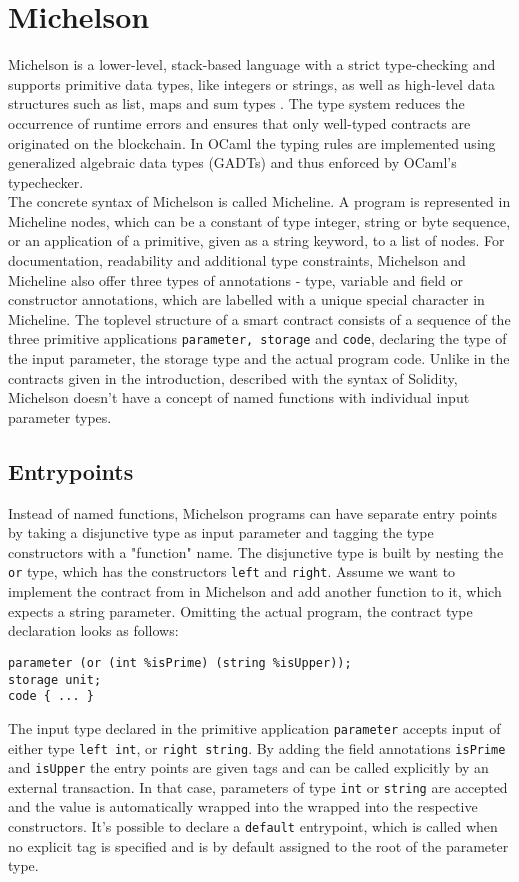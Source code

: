\section{Michelson}
Michelson is a lower-level, stack-based language with a strict type-checking and supports primitive data types, like integers or strings, as well as high-level data structures such as list, maps and sum types \cite{tezos_docs_michelson}. The type system reduces the occurrence of runtime errors and ensures that only well-typed contracts are originated on the blockchain. In OCaml the typing rules are implemented using generalized algebraic data types (GADTs) \cite{tezos_docs_michelson} and thus enforced by OCaml's typechecker. \\
The concrete syntax of Michelson is called Micheline. A program is represented in Micheline nodes, which can be a constant of type integer, string or byte sequence, or an application of a primitive, given as a string keyword, to a list of nodes. For documentation, readability and additional type constraints, Michelson and Micheline also offer three types of annotations - type, variable and field or constructor annotations, which are labelled with a unique special character in Micheline. The toplevel structure of a smart contract consists of a sequence of the three primitive applications \texttt{parameter, storage} and \texttt{code}, declaring the type of the input parameter, the storage type and the actual program code. Unlike in the contracts given in the introduction, described with the syntax of Solidity, Michelson doesn't have a concept of named functions with individual input parameter types. 


\subsection{Entrypoints}
Instead of named functions, Michelson programs can have separate entry points by taking a disjunctive type as input parameter and tagging the type constructors with a "function" name. The disjunctive type is built by nesting the \texttt{or} type, which has the constructors \texttt{left} and \texttt{right}. Assume we want to implement the contract from  in Michelson and add another function to it, which expects a string parameter. Omitting the actual program, the contract type declaration looks as follows:
\begin{lstlisting}[language=Michelson, numbers=none]
parameter (or (int %isPrime) (string %isUpper));
storage unit;
code { ... }
\end{lstlisting}
The input type declared in the primitive application \texttt{parameter} accepts input of either type \texttt{left int}, or \texttt{right string}. By adding the field annotations \texttt{isPrime} and \texttt{isUpper} the entry points are given tags and can be called explicitly by an external transaction. In that case, parameters of type \texttt{int} or \texttt{string} are accepted and the value is automatically wrapped into the wrapped into the respective constructors. It's possible to declare a \texttt{default} entrypoint, which is called when no explicit tag is specified and is by default assigned to the root of the parameter type.

